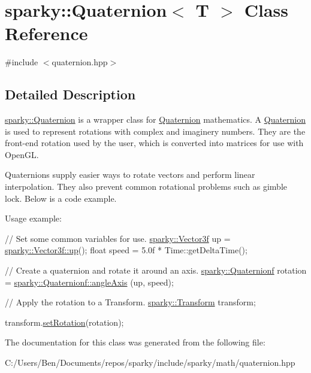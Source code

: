 \hypertarget{classsparky_1_1_quaternion_3_01_t_01_4}{}\section{sparky\+:\+:Quaternion$<$ T $>$ Class Reference}
\label{classsparky_1_1_quaternion_3_01_t_01_4}


{\ttfamily \#include $<$quaternion.\+hpp$>$}



\subsection{Detailed Description}
\hyperlink{classsparky_1_1_quaternion}{sparky\+::\+Quaternion} is a wrapper class for \hyperlink{classsparky_1_1_quaternion}{Quaternion} mathematics. A \hyperlink{classsparky_1_1_quaternion}{Quaternion} is used to represent rotations with complex and imaginery numbers. They are the front-\/end rotation used by the user, which is converted into matrices for use with Open\+GL.

Quaternions supply easier ways to rotate vectors and perform linear interpolation. They also prevent common rotational problems such as gimble lock. Below is a code example.

Usage example\+: 
\begin{DoxyCode}
\textcolor{comment}{// Set some common variables for use.}
\hyperlink{classsparky_1_1_vector3}{sparky::Vector3f} up = \hyperlink{classsparky_1_1_vector3_af54c2e1458f00c76b06c61641c856c95}{sparky::Vector3f::up}();
\textcolor{keywordtype}{float} speed = 5.0f * Time::getDeltaTime();

\textcolor{comment}{// Create a quaternion and rotate it around an axis.}
\hyperlink{classsparky_1_1_quaternion}{sparky::Quaternionf} rotation = \hyperlink{classsparky_1_1_quaternion_a66ae7960536a332a5d2e133bb14bc5c5}{sparky::Quaternionf::angleAxis}
      (up, speed);

\textcolor{comment}{// Apply the rotation to a Transform.}
\hyperlink{classsparky_1_1_transform}{sparky::Transform} transform;

transform.\hyperlink{classsparky_1_1_transform_a870405b2aa4bd13ffa48a8e072f7bf3b}{setRotation}(rotation);
\end{DoxyCode}
 

The documentation for this class was generated from the following file\+:\begin{DoxyCompactItemize}
\item 
C\+:/\+Users/\+Ben/\+Documents/repos/sparky/include/sparky/math/quaternion.\+hpp\end{DoxyCompactItemize}

